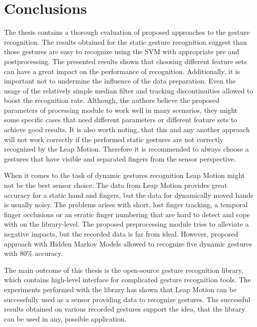 \chapter{Conclusions}


The thesis contains a thorough evaluation of proposed approaches to the gesture recognition.
The results obtained for the static gesture recognition suggest than those gestures are easy to recognize using the SVM with appropriate pre and postprocessing.
The presented results shown that choosing different feature sets can have a great impact on the performance of recognition.
Additionally, it is important not to undermine the influence of the data preparation. 
Even the usage of the relatively simple median filter and tracking discontinuities allowed to boost the recognition rate.
Although, the authors believe the proposed parameters of processing module to work well in many scenarios, they might some specific cases that need different parameters or different feature sets to achieve good results.
It is also worth noting, that this and any another approach will not work correctly if the performed static gestures are not correctly recognized by the Leap Motion.
Therefore it is recommended to always choose a gestures that have visible and separated fingers from the sensor perspective.

When it comes to the task of dynamic gestures recognition Leap Motion might not be the best sensor choice.
The data from Leap Motion provides great accuracy for a static hand and fingers, but the data for dynamically moved hands is usually noisy.
The problems arises with short, lost finger tracking, a temporal finger occlusions or an erratic finger numbering that are hard to detect and cope with on the library-level.
The proposed preprocessing module tries to alleviate a negative impacts, but the recorded data is far from ideal.
However, proposed approach with Hidden Markov Models allowed to recognize five dynamic gestures with 80\% accuracy.

 

The main outcome of this thesis is the open-source gesture recognition library, which contains high-level interface for complicated gesture recognition tools.
The experiments performed with the library has shown that Leap Motion can be successfully used as a sensor providing data to recognize gestures.
The successful results obtained on various recorded gestures support the idea, that the library can be used in any, possible application. 


